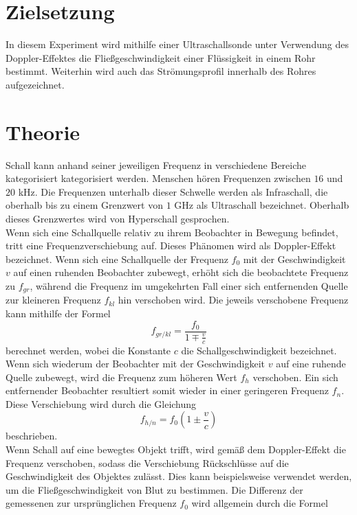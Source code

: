 \section{Zielsetzung}
In diesem Experiment wird mithilfe einer Ultraschallsonde unter Verwendung des Doppler-Effektes die Fließgeschwindigkeit einer Flüssigkeit in einem Rohr bestimmt. Weiterhin wird auch das Strömungsprofil innerhalb des Rohres aufgezeichnet.
\section{Theorie}
Schall kann anhand seiner jeweiligen Frequenz in verschiedene Bereiche kategorisiert kategorisiert werden. Menschen hören Frequenzen zwischen $16$ und $20$ kHz. Die Frequenzen unterhalb dieser Schwelle werden als Infraschall, die oberhalb bis zu einem Grenzwert von $1$ GHz als Ultraschall bezeichnet. Oberhalb dieses Grenzwertes wird von Hyperschall gesprochen. \\
Wenn sich eine Schallquelle relativ zu ihrem Beobachter in Bewegung befindet, tritt eine Frequenzverschiebung auf. Dieses Phänomen wird als Doppler-Effekt bezeichnet. Wenn sich eine Schallquelle der Frequenz $f_0$ mit der Geschwindigkeit $v$ auf einen ruhenden Beobachter zubewegt, erhöht sich die beobachtete Frequenz zu $f_{gr}$, während die Frequenz im umgekehrten Fall einer sich entfernenden Quelle zur kleineren Frequenz $f_{kl}$ hin verschoben wird. Die jeweils verschobene Frequenz kann mithilfe der Formel
\begin{equation}
f_{gr/kl}=\frac{f_0}{1 \mp \frac{v}{c}}
\end{equation}
berechnet werden, wobei die Konstante $c$ die Schallgeschwindigkeit bezeichnet. \\
Wenn sich wiederum der Beobachter mit der Geschwindigkeit $v$ auf eine ruhende Quelle zubewegt, wird die Frequenz zum höheren Wert $f_h$ verschoben. Ein sich entfernender Beobachter resultiert somit wieder in einer geringeren Frequenz $f_n$. Diese Verschiebung wird durch die Gleichung 
\begin{equation}
f_{h/n}=f_0(1 \pm \frac{v}{c})
\end{equation}
beschrieben. \\
Wenn Schall auf eine bewegtes Objekt trifft, wird gemäß dem Doppler-Effekt die Frequenz verschoben, sodass die Verschiebung Rückschlüsse auf die Geschwindigkeit des Objektes zulässt. Dies kann beispielsweise verwendet werden, um die Fließgeschwindigkeit von Blut zu bestimmen. Die Differenz der gemessenen zur ursprünglichen Frequenz $f_0$ wird allgemein durch die Formel 
